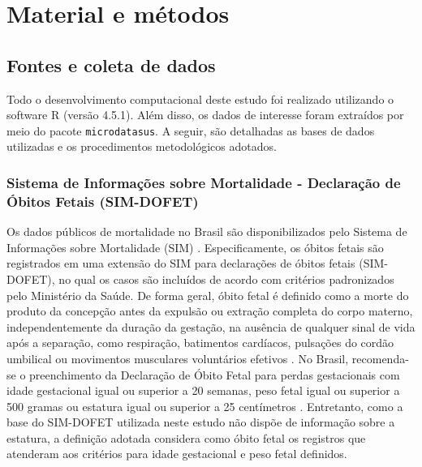 %

\chapter{Material e métodos}
\section{Fontes e coleta de dados}

Todo o desenvolvimento computacional deste estudo foi realizado utilizando o 
software R (versão 4.5.1)\cite{rsoftware}. Além disso, os dados de interesse 
foram extraídos por meio do pacote \texttt{microdatasus}\cite{saldanha2019microdatasus}. 
A seguir, são detalhadas as bases de dados utilizadas e os procedimentos metodológicos 
adotados.

\subsection{Sistema de Informações sobre Mortalidade - Declaração de Óbitos
Fetais (SIM-DOFET)}

Os dados públicos de mortalidade no Brasil são disponibilizados pelo Sistema de 
Informações sobre Mortalidade (SIM) \cite{DATASUSSIM2023}. Especificamente, os óbitos fetais são 
registrados em uma extensão do SIM para declarações de óbitos fetais 
(SIM-DOFET), no qual os casos são incluídos de acordo com critérios padronizados 
pelo Ministério da Saúde. De forma geral, óbito fetal é definido como a morte do 
produto da concepção antes da expulsão ou extração completa do corpo materno, 
independentemente da duração da gestação, na ausência de qualquer sinal de vida 
após a separação, como respiração, batimentos cardíacos, pulsações do cordão 
umbilical ou movimentos musculares voluntários efetivos \cite{Andrade2005,Lawn2016}. 
No Brasil, recomenda-se o preenchimento da Declaração de Óbito Fetal para perdas 
gestacionais com idade gestacional igual ou superior a 20 semanas, peso fetal igual 
ou superior a 500 gramas ou estatura igual ou superior a 25 centímetros \cite{Andrade2005,ministerioSaudeDO2022}. 
Entretanto, como a base do SIM-DOFET utilizada neste estudo não dispõe de informação 
sobre a estatura, a definição adotada considera como óbito fetal os registros que 
atenderam aos critérios para idade gestacional e peso fetal definidos.


